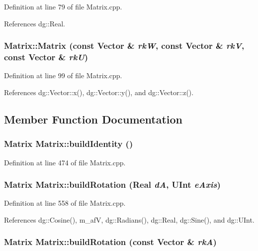 Definition at line 79 of file Matrix.cpp.

References dg::Real.
\subsubsection{\setlength{\rightskip}{0pt plus 5cm}Matrix::Matrix (const {\bf Vector} \& {\em rk\-W}, const {\bf Vector} \& {\em rk\-V}, const {\bf Vector} \& {\em rk\-U})}\label{classdg_1_1Matrix_a4}




Definition at line 99 of file Matrix.cpp.

References dg::Vector::x(), dg::Vector::y(), and dg::Vector::z().

\subsection{Member Function Documentation}
\subsubsection{\setlength{\rightskip}{0pt plus 5cm}Matrix Matrix::build\-Identity ()\hspace{0.3cm}{\tt  [static]}}\label{classdg_1_1Matrix_d0}




Definition at line 474 of file Matrix.cpp.
\subsubsection{\setlength{\rightskip}{0pt plus 5cm}Matrix Matrix::build\-Rotation ({\bf Real} {\em d\-A}, {\bf UInt} {\em e\-Axis})\hspace{0.3cm}{\tt  [static]}}\label{classdg_1_1Matrix_d6}




Definition at line 558 of file Matrix.cpp.

References dg::Cosine(), m\_\-af\-V, dg::Radians(), dg::Real, dg::Sine(), and dg::UInt.
\subsubsection{\setlength{\rightskip}{0pt plus 5cm}Matrix Matrix::build\-Rotation (const {\bf Vector} \& {\em rk\-A})\hspace{0.3cm}{\tt  [static]}}\label{classdg_1_1Matrix_d5}




